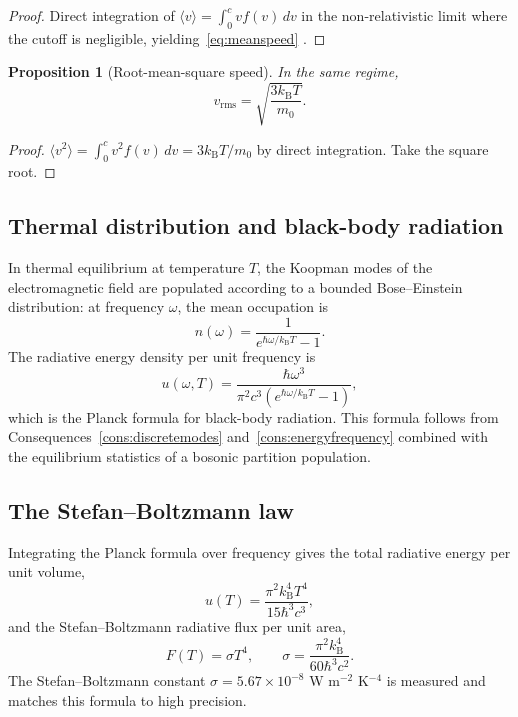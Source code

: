 \documentclass[11pt,twocolumn,a4paper]{article}
\theoremstyle{axiomstyle}
\theoremstyle{conseqstyle}
\newtheorem{proposition}{Proposition}
\theoremstyle{definition}
\theoremstyle{remark}
\newcommand{\kB}{k_{\mathrm{B}}}
\begin{document}
\begin{proof}
Direct integration of $\langle v\rangle=\int_{0}^{c}v f(v)\,dv$ in the non-relativistic limit where the cutoff is negligible, yielding~\eqref{eq:meanspeed} \citep{landaulifshitz5}.
\end{proof}

\begin{proposition}[Root-mean-square speed]
\label{prop:rmsspeed}
In the same regime,
\begin{equation}
v_{\mathrm{rms}}=\sqrt{\frac{3\kB T}{m_{0}}}.
\label{eq:rmsspeed}
\end{equation}
\end{proposition}

\begin{proof}
$\langle v^{2}\rangle=\int_{0}^{c}v^{2}f(v)\,dv=3\kB T/m_{0}$ by direct integration. Take the square root.
\end{proof}

\subsection{Thermal distribution and black-body radiation}

In thermal equilibrium at temperature $T$, the Koopman modes of the electromagnetic field are populated according to a bounded Bose--Einstein distribution: at frequency $\omega$, the mean occupation is
\begin{equation*}
n(\omega)=\frac{1}{e^{\hbar\omega/\kB T}-1}.
\end{equation*}
The radiative energy density per unit frequency is
\begin{equation*}
u(\omega,T)=\frac{\hbar\omega^{3}}{\pi^{2}c^{3}(e^{\hbar\omega/\kB T}-1)},
\end{equation*}
which is the Planck formula for black-body radiation. This formula follows from Consequences~\ref{cons:discretemodes} and~\ref{cons:energyfrequency} combined with the equilibrium statistics of a bosonic partition population.

\subsection{The Stefan--Boltzmann law}

Integrating the Planck formula over frequency gives the total radiative energy per unit volume,
\begin{equation*}
u(T)=\frac{\pi^{2}\kB^{4}T^{4}}{15\hbar^{3}c^{3}},
\end{equation*}
and the Stefan--Boltzmann radiative flux per unit area,
\begin{equation*}
F(T)=\sigma T^{4},\qquad \sigma=\frac{\pi^{2}\kB^{4}}{60\hbar^{3}c^{2}}.
\end{equation*}
The Stefan--Boltzmann constant $\sigma=5.67\times 10^{-8}$ W m$^{-2}$ K$^{-4}$ is measured and matches this formula to high precision.
\end{document}
